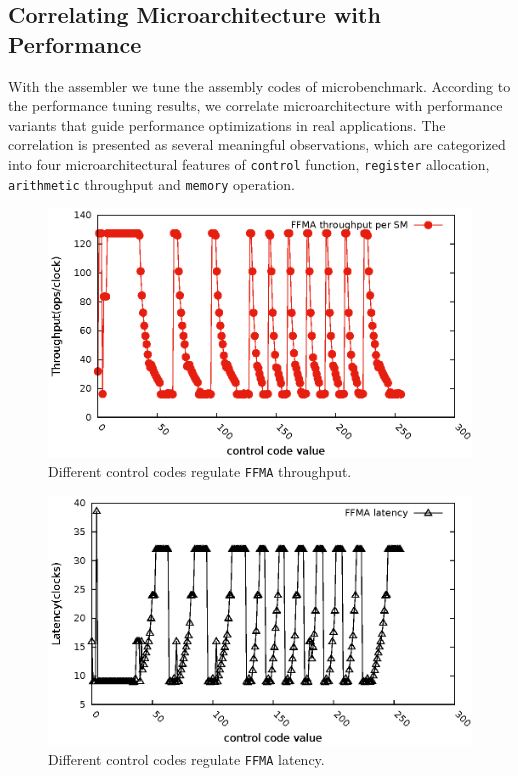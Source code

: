 \documentclass{sig-alternate-05-2015}
\begin{document}
\subsection{Correlating Microarchitecture with Performance}
With the assembler we tune the assembly codes of microbenchmark. According to the performance tuning results, we correlate microarchitecture with performance variants that guide performance optimizations in real applications. The correlation is presented as several meaningful observations, which are categorized into four microarchitectural features of {\tt control} function, {\tt register} allocation, {\tt arithmetic} throughput and {\tt memory} operation.

\begin{figure}[htbp]
\begin{center}
\includegraphics[scale=0.5]{ctrl}
\caption{Different control codes regulate {\tt FFMA} throughput.}
\label{fig:control}
\end{center}
\end{figure}

\begin{figure}[htbp]
\begin{center}
\includegraphics[scale=0.5]{ctrl_latency}
\caption{Different control codes regulate {\tt FFMA} latency.}
\label{fig:control}
\end{center}
\end{figure}
\end{document}
